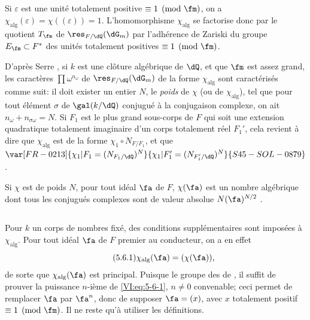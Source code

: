 \subsection{}\label{VI:5-5}

Si $\varepsilon$ est une unité totalement positive $\equiv 1\pmod\fm$, on a 
$\chi_\text{alg}(\varepsilon) = \chi((\varepsilon)) = 1$. L'homomorphisme 
$\chi_\text{alg}$ se factorise donc par le quotient $T_\fm$ de 
$\res_{F/\dQ}(\dG_m)$ par l'adhérence de Zariski du groupe 
$E_\fm\subset F^\ast$ des unités totalement positives $\equiv 1\pmod\fm$. 

D'après Serre , si $k$ est une clôture algébrique de 
$\dQ$, et que $\fm$ est assez grand, les caractères $\prod \omega^{n_\omega}$ 
de $\res_{F/\dQ}(\dG_m)$ de la forme $\chi_\text{alg}$ sont caractérisés 
comme suit: il doit exister un entier $N$, le \emph{poids} de $\chi$ (ou de 
$\chi_\text{alg}$), tel que pour tout élément $\sigma$ de $\gal(k/\dQ)$ 
conjugué à la conjugaison complexe, on ait $n_\omega+n_{\sigma \omega}=N$. Si 
$F_1$ est le plus grand sous-corps de $F$ qui soit une extension quadratique 
totalement imaginaire d'un corps totalement réel $F_1'$, cela revient à 
dire que $\chi_\text{alg}$ est de la forme $\chi_1\circ N_{F/F_1}$, et que 
$\var[FR-0213]{\chi_1|F_1=(N_{F_1/\dQ})^N}{\chi_1|F_1'=(N_{F_1'/\dQ})^N}{S45-SOL-0879}$. 

Si $\chi$ est de poids $N$, pour tout idéal $\fa$ de $F$, $\chi(\fa)$ est un 
nombre algébrique dont tous les conjugués complexes sont de valeur absolue 
$N(\fa)^{N/2}$ . 





\subsection{}\label{VI:5-6}

Pour $k$ un corps de nombres fixé, des conditions supplémentaires sont 
imposées à $\chi_\text{alg}$. Pour tout idéal $\fa$ de $F$ premier au 
conducteur, on a en effet 
\begin{equation*}\tag{5.6.1}\label{VI:eq:5-6-1}
  \chi_\text{alg}(\fa) = (\chi(\fa)) \text{,} 
\end{equation*}
de sorte que $\chi_\text{alg}(\fa)$ est principal. Puisque le groupe des 
 de , il suffit de prouver la 
puissance $n$-ième de \eqref{VI:eq:5-6-1}, $n\ne 0$ convenable; ceci permet 
de remplacer $\fa$ par $\fa^n$, donc de supposer $\fa=(x)$, avec $x$ totalement 
positif $\equiv 1\pmod\fm$. Il ne reste qu'à utiliser les définitions. 

